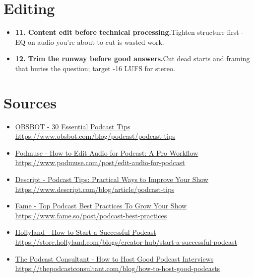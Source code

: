 \documentclass[11pt]{article}
\newcommand{\tip}[2]{\item \textbf{#1.}\enspace #2}
\newcommand{\tlabel}{\textcolor{accent}{\small$\blacktriangleright$}}
\begin{document}
\section*{Editing}
\begin{itemize}[label=\tlabel]
\tip{11. Content edit before technical processing}{Tighten structure first - EQ on audio you're about to cut is wasted work.}
\tip{12. Trim the runway before good answers}{Cut dead starts and framing that buries the question; target -16 LUFS for stereo.}
\end{itemize}
\section*{Sources}
\begin{itemize}[label={},leftmargin=0.9em,itemsep=1pt]
\footnotesize
\item \href{https://www.obsbot.com/blog/podcast/podcast-tips}{OBSBOT - 30 Essential Podcast Tips} \\ {\color{softgray}\url{https://www.obsbot.com/blog/podcast/podcast-tips}}
\item \href{https://www.podmuse.com/post/edit-audio-for-podcast}{Podmuse - How to Edit Audio for Podcast: A Pro Workflow} \\ {\color{softgray}\url{https://www.podmuse.com/post/edit-audio-for-podcast}}
\item \href{https://www.descript.com/blog/article/podcast-tips}{Descript - Podcast Tips: Practical Ways to Improve Your Show} \\ {\color{softgray}\url{https://www.descript.com/blog/article/podcast-tips}}
\item \href{https://www.fame.so/post/podcast-best-practices}{Fame - Top Podcast Best Practices To Grow Your Show} \\ {\color{softgray}\url{https://www.fame.so/post/podcast-best-practices}}
\item \href{https://store.hollyland.com/blogs/creator-hub/start-a-successful-podcast}{Hollyland - How to Start a Successful Podcast} \\ {\color{softgray}\url{https://store.hollyland.com/blogs/creator-hub/start-a-successful-podcast}}
\item \href{https://thepodcastconsultant.com/blog/how-to-host-good-podcasts}{The Podcast Consultant - How to Host Good Podcast Interviews} \\ {\color{softgray}\url{https://thepodcastconsultant.com/blog/how-to-host-good-podcasts}}
\end{itemize}
\normalsize
\end{document}
